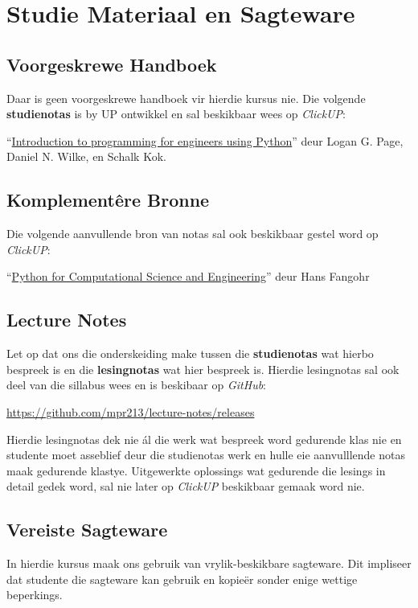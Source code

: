 \section{Studie Materiaal en Sagteware}
    \subsection{Voorgeskrewe Handboek}
        Daar is geen voorgeskrewe handboek vir hierdie kursus nie. Die volgende
        \textbf{studienotas} is by UP ontwikkel en sal beskikbaar wees op
        \textit{ClickUP}:

        ``\underline{Introduction to programming for engineers using Python}''
        deur Logan G. Page, Daniel N. Wilke, en Schalk Kok.

    \subsection{Komplement\^{e}re Bronne}
        Die volgende aanvullende bron van notas sal ook beskikbaar gestel word
        op \textit{ClickUP}:

        ``\underline{Python for Computational Science and Engineering}'' deur
        Hans Fangohr

    \subsection{Lecture Notes}
        Let op dat ons die onderskeiding make tussen die \textbf{studienotas}
        wat hierbo bespreek is en die \textbf{lesingnotas} wat hier bespreek
        is. Hierdie lesingnotas sal ook deel van die sillabus wees en is
        beskibaar op \textit{GitHub}:

        \url{https://github.com/mpr213/lecture-notes/releases}

        Hierdie lesingnotas dek nie \'{a}l die werk wat bespreek word gedurende
        klas nie en studente moet asseblief deur die studienotas werk en hulle
        eie aanvulllende notas maak gedurende klastye. Uitgewerkte oplossings
        wat gedurende die lesings in detail gedek word, sal nie later op
        \textit{ClickUP} beskikbaar gemaak word nie.

    \subsection{Vereiste Sagteware}
        In hierdie kursus maak ons gebruik van vrylik-beskikbare sagteware.
        Dit impliseer dat studente die sagteware kan gebruik en kopie\"er
        sonder enige wettige beperkings.

